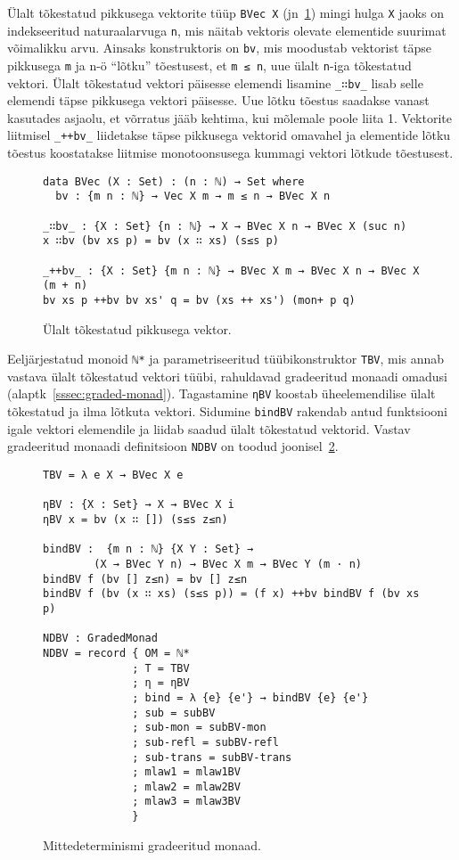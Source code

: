 \documentclass[a4paper,12pt]{article}
\begin{document}
Ülalt tõkestatud pikkusega vektorite tüüp {\tt BVec X} (jn~\ref{fig:nd.bvec}) mingi hulga {\tt X} jaoks on indekseeritud naturaalarvuga {\tt n}, mis näitab vektoris olevate elementide suurimat võimalikku arvu.
Ainsaks konstruktoris on {\tt bv}, mis moodustab vektorist täpse pikkusega {\tt m} ja n-ö ``lõtku'' tõestusest, et {\tt m ≤ n}, uue ülalt {\tt n}-iga tõkestatud vektori.
Ülalt tõkestatud vektori päisesse elemendi lisamine {\tt _∷bv_} lisab selle elemendi täpse pikkusega vektori päisesse. Uue lõtku tõestus saadakse vanast kasutades asjaolu, et võrratus jääb kehtima, kui mõlemale poole liita 1.
Vektorite liitmisel {\tt _++bv_} liidetakse täpse pikkusega vektorid omavahel ja elementide lõtku tõestus koostatakse liitmise monotoonsusega kummagi vektori lõtkude tõestusest.

\begin{figure}
  \begin{BVerbatim}
data BVec (X : Set) : (n : ℕ) → Set where
  bv : {m n : ℕ} → Vec X m → m ≤ n → BVec X n

_∷bv_ : {X : Set} {n : ℕ} → X → BVec X n → BVec X (suc n)
x ∷bv (bv xs p) = bv (x ∷ xs) (s≤s p)

_++bv_ : {X : Set} {m n : ℕ} → BVec X m → BVec X n → BVec X (m + n)
bv xs p ++bv bv xs' q = bv (xs ++ xs') (mon+ p q)    
  \end{BVerbatim}
  \caption{Ülalt tõkestatud pikkusega vektor.}
  \label{fig:nd.bvec}
\end{figure}

Eeljärjestatud monoid {\tt ℕ*} ja parametriseeritud tüübikonstruktor {\tt TBV}, mis annab vastava ülalt tõkestatud vektori tüübi, rahuldavad gradeeritud monaadi omadusi (alaptk~\ref{sssec:graded-monad}). Tagastamine {\tt ηBV} koostab üheelemendilise ülalt tõkestatud ja ilma lõtkuta vektori. Sidumine {\tt bindBV} rakendab antud funktsiooni igale vektori elemendile ja liidab saadud ülalt tõkestatud vektorid.
Vastav gradeeritud monaadi definitsioon {\tt NDBV} on toodud joonisel~\ref{fig:nd.graded-monad}.


\begin{figure}
  \begin{BVerbatim}
TBV = λ e X → BVec X e

ηBV : {X : Set} → X → BVec X i
ηBV x = bv (x ∷ []) (s≤s z≤n)

bindBV :  {m n : ℕ} {X Y : Set} →
        (X → BVec Y n) → BVec X m → BVec Y (m · n)
bindBV f (bv [] z≤n) = bv [] z≤n
bindBV f (bv (x ∷ xs) (s≤s p)) = (f x) ++bv bindBV f (bv xs p)

NDBV : GradedMonad
NDBV = record { OM = ℕ*
              ; T = TBV
              ; η = ηBV
              ; bind = λ {e} {e'} → bindBV {e} {e'}
              ; sub = subBV
              ; sub-mon = subBV-mon
              ; sub-refl = subBV-refl
              ; sub-trans = subBV-trans
              ; mlaw1 = mlaw1BV
              ; mlaw2 = mlaw2BV
              ; mlaw3 = mlaw3BV
              }
  \end{BVerbatim}
  \caption{Mittedeterminismi gradeeritud monaad.}
  \label{fig:nd.graded-monad}
\end{figure}
\end{document}
